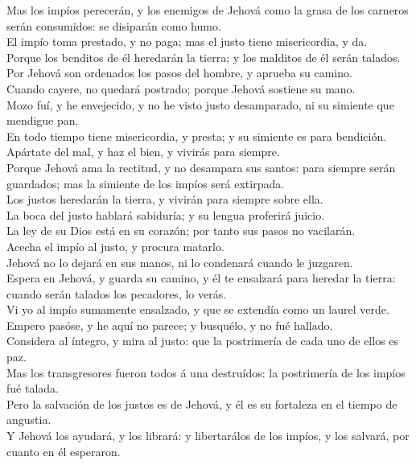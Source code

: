  Mas los impíos perecerán, y los enemigos de Jehová como
la grasa de los carneros serán consumidos: se disiparán como humo.\\
 El impío toma prestado, y no paga; mas el justo tiene
misericordia, y da.\\
 Porque los benditos de él heredarán la tierra; y los
malditos de él serán talados.\\
 Por Jehová son ordenados los pasos del hombre, y aprueba
su camino.\\
 Cuando cayere, no quedará postrado; porque Jehová
sostiene su mano.\\
 Mozo fuí, y he envejecido, y no he visto justo
desamparado, ni su simiente que mendigue pan.\\
 En todo tiempo tiene misericordia, y presta; y su
simiente es para bendición.\\
 Apártate del mal, y haz el bien, y vivirás para
siempre.\\
 Porque Jehová ama la rectitud, y no desampara sus
santos: para siempre serán guardados; mas la simiente de los impíos será
extirpada.\\
 Los justos heredarán la tierra, y vivirán para siempre
sobre ella.\\
 La boca del justo hablará sabiduría; y su lengua
proferirá juicio.\\
 La ley de su Dios está en su corazón; por tanto sus
pasos no vacilarán.\\
 Acecha el impío al justo, y procura matarlo.\\
 Jehová no lo dejará en sus manos, ni lo condenará cuando
le juzgaren.\\
 Espera en Jehová, y guarda su camino, y él te ensalzará
para heredar la tierra: cuando serán talados los pecadores, lo verás.\\
 Vi yo al impío sumamente ensalzado, y que se extendía
como un laurel verde.\\
 Empero pasóse, y he aquí no parece; y busquélo, y no fué
hallado.\\
 Considera al íntegro, y mira al justo: que la
postrimería de cada uno de ellos es paz.\\
 Mas los transgresores fueron todos á una destruídos: la
postrimería de los impíos fué talada.\\
 Pero la salvación de los justos es de Jehová, y él es su
fortaleza en el tiempo de angustia.\\
 Y Jehová los ayudará, y los librará: y libertarálos de
los impíos, y los salvará, por cuanto en él esperaron.

